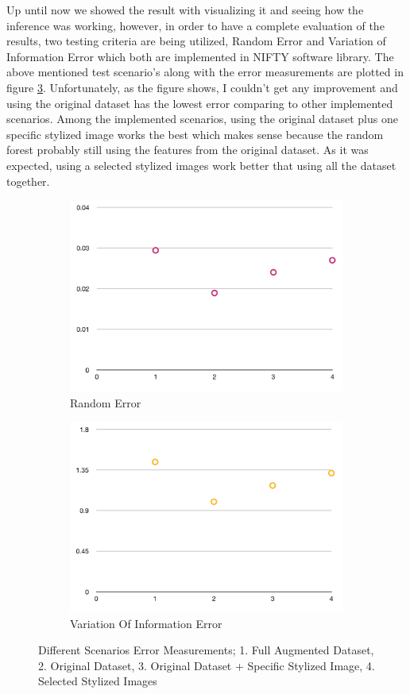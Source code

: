 \documentclass[12pt, a4paper]{scrartcl}
\begin{document}
Up until now we showed the result with visualizing it and seeing how the inference was working, however, in order to have a complete evaluation of the results, two testing criteria are being utilized, Random Error and Variation of Information Error which both are implemented in NIFTY software library. The above mentioned test scenario's along with the error measurements are plotted in figure \ref{fig:error}. Unfortunately, as the figure shows, I couldn't get any improvement and using the original dataset has the lowest error comparing to other implemented scenarios. Among the implemented scenarios, using the original dataset plus one  specific stylized image works the best which makes sense because the random forest probably still using the features from the original dataset. As it was expected, using a selected stylized images work better that using all the dataset together. 

\begin{figure}[H]
\centering
\begin{subfigure}{.45\textwidth}
  \centering
  \includegraphics[width=.9\linewidth]{error1}
  \caption{Random Error}
  \label{fig:error1}
\end{subfigure}%
\begin{subfigure}{.45\textwidth}
  \centering
  \includegraphics[width=.9\linewidth]{error2}
  \caption{Variation Of Information Error}
  \label{fig:error2}
\end{subfigure}
\caption{Different Scenarios Error Measurements; 1. Full Augmented Dataset, 2. Original Dataset, 3. Original Dataset + Specific Stylized Image, 4. Selected Stylized Images }
\label{fig:error}
\end{figure}
\end{document}
